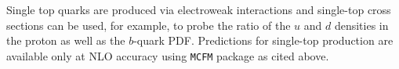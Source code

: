 Single top quarks are produced via electroweak interactions and single-top cross sections 
can be used, for example, to probe the ratio of the $u$ and $d$ densities in the proton 
as well as the $b$-quark PDF. Predictions 
for single-top production are available only at NLO accuracy using \texttt{MCFM} package as cited above.


%
